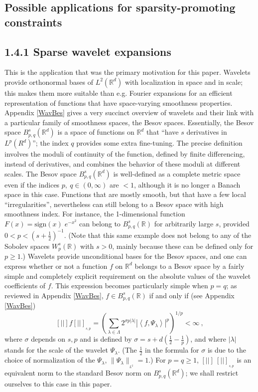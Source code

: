 \documentclass[10pt]{article}
\def\R{\mathbb{R}}
\def\VVert{[\!|\!|\!]}
\begin{document}
\subsection{Possible applications for sparsity-promoting constraints}
\subsection*{1.4.1 Sparse wavelet expansions}

This is the application that was the primary motivation for this paper.
Wavelets provide orthonormal bases of $L^2(\R^d)$ with localization
in space and in scale; this makes them more suitable than e.g.
 Fourier expansions for an efficient
representation of functions that have space-varying smoothness properties.
Appendix \ref{WavBes} gives a very succinct overview of wavelets and their
link
with
a particular family of smoothness spaces, the Besov spaces. Essentially,
the Besov space $B^s_{p,q}(\R^d)$ is a space of functions on
$\R^d$ that ``have $s$ derivatives in $L^p(R^d)$''; the
index $q$ provides some extra fine-tuning. The
precise definition involves the moduli of continuity of the function,
defined by finite differencing, instead of derivatives, and combines
the behavior of these moduli at different scales. 
The Besov space $B^s_{p,q}(\R^d)$ is well-defined as
a complete metric space even if the indices $p,~q \in (0,\infty)$ are
$<1$, although it is no longer a Banach space in this case. 
Functions that are mostly smooth, but that have a few local
``irregularities'', nevertheless can still belong to a Besov space with
high smoothness index. For instance, the 1-dimensional function
$F(x)= \mbox{sign} (x)\; e^{-x^2}$ can belong to $B^s_{p,q}(\R)$ for
arbitrarily large $s$, provided $0<p<\left(s+\frac{1}{2}\right)^{-1}$. (Note that
this same example does not belong to any of the Sobolev spaces
$W^s_p(\R)$ with $s>0$, mainly because these can be defined only for
$p\geq 1$.) Wavelets provide unconditional bases for the Besov spaces,
and one can express whether or not a function $f$ on $\R^d$ belongs
to a Besov space by a fairly simple and completely explicit requirement
on the absolute values of the wavelet coefficients of $f$. 
This expression becomes particularly simple when $p=q$; as 
reviewed in Appendix \ref{WavBes},
$f \in B^s_{p,q}(\R)$ if and only if (see Appendix \ref{WavBes})
\begin{equation*}
\VVert f \VVert_{ _{s,p}} = \left( \sum_{\lambda \in \Lambda} 2^{\sigma p
|\lambda|} |\left<f, \Psi_{\lambda} \right> |^p \right) ^{1/p} < \infty~,
\end{equation*}
where $\sigma$ depends on $s,p$ and is defined by $\sigma =s +d \left(
\frac{1}{2}-\frac{1}{p} \right)$,
and where $|\lambda |$ stands for the scale of the wavelet
$\Psi_{\lambda}$. (The $\frac{1}{2}$ in the formula for $\sigma$ is
due to the choice of normalization
of the $\Psi_{\lambda}$, $\|\Psi_{\lambda}\|_{_{L^2}} =1$.)
For $p=q\geq 1$, $\VVert ~ \VVert_{ _{s,p}}$ is an equivalent norm to the
standard Besov norm on $B^s_{p,q}(\R^d)$; we shall restrict ourselves to 
this case in this paper.
\end{document}
